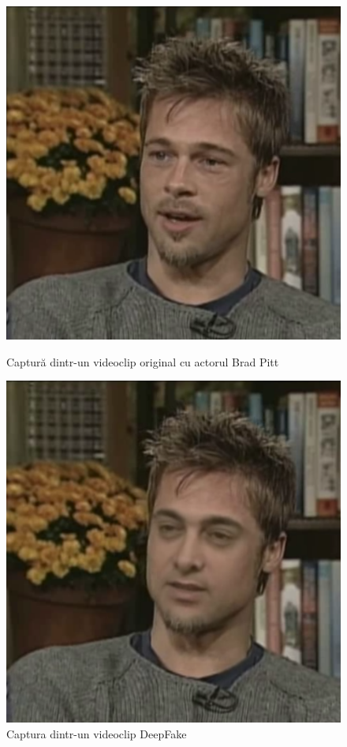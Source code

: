 \begin{figure}[htbp]
    \centering
    \begin{minipage}[b]{0.45\textwidth}
        \centering
        \includegraphics[width=\textwidth]{images/brad-pitt_real.png}
        \caption{Captură dintr-un videoclip original cu actorul Brad Pitt}
    \end{minipage}
    \hfill
    \begin{minipage}[b]{0.45\textwidth}
        \centering
        \includegraphics[width=\textwidth]{images/brad-pitt_df.png}
        \caption{Captura dintr-un videoclip DeepFake}
    \end{minipage}
\end{figure}

